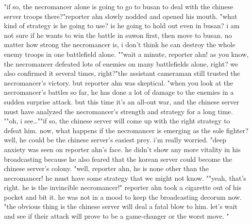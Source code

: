 "if so, the necromancer alone is going to go to busan to deal with the chinese server troops there?"reporter ahn slowly nodded and opened his mouth.
"what kind of strategy is he going to use? is he going to hold out even in busan? i am not sure if he wants to win the battle in suwon first, then move to busan.
 no matter how strong the necromancer is, i don't think he can destroy the whole enemy troops in one battlefield alone.
""wait a minute, reporter ahn! as you know, the necromancer defeated lots of enemies on many battlefields alone, right? we also confirmed it several times, right?"the assistant cameraman still trusted the necromancer's victory.
 but reporter ahn was skeptical.
"when you look at the necromancer's battles so far, he has done a lot of damage to the enemies in a sudden surprise attack.
 but this time it's an all-out war, and the chinese server must have analyzed the necromancer's strength and strategy for a long time.
""oh, i see…""if so, the chinese server will come up with the right strategy to defeat him.
 now, what happens if the necromancer is emerging as the sole fighter? well, he could be the chinese server's easiest prey.
 i'm really worried.
"deep anxiety was seen on reporter ahn's face.
 he didn't show any more vitality in his broadcasting because he also feared that the korean server could become the chinese server's colony.
 "well, reporter ahn, he is none other than the necromancer! he must have some strategy that we might not know.
""yeah, that's right.
 he is the invincible necromancer!" reporter ahn took a cigarette out of his pocket and bit it.
 he was not in a mood to keep the broadcasting decorum now.
"the obvious thing is the chinese server will deal a fatal blow to him.
 let's wait and see if their attack will prove to be a game-changer or the worst move.
"

 